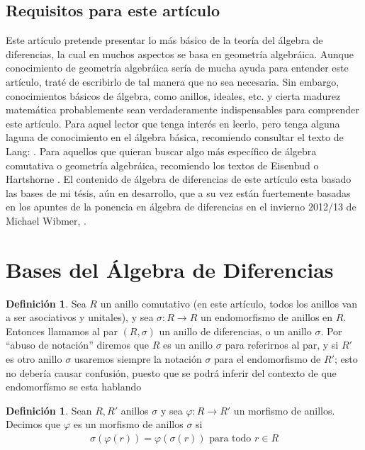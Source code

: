 \documentclass[12pt,a4paper,BCOR15mm,twoside,DIV12]{article}
\def\fa{\text{ para todo }}
\theoremstyle{definition}
\newtheorem{defn}[Satz]{Definición}
\begin{document}
\subsection{Requisitos para este artículo}

Este artículo pretende presentar lo más básico de la teoría del álgebra de diferencias, la cual en muchos aspectos se basa en geometría algebráica. Aunque conocimiento de geometría algebráica sería de mucha ayuda para entender este artículo, traté de escribirlo
de tal manera que no sea necesaria. Sin embargo, conocimientos básicos de álgebra, como anillos, ideales, etc. y cierta madurez matemática probablemente sean verdaderamente indispensables para comprender este artículo. 
Para aquel lector que tenga interés en leerlo, pero tenga alguna laguna de conocimiento en el álgebra básica, recomiendo consultar el texto de Lang: \cite{lang}. Para aquellos que quieran buscar algo más específico de álgebra comutativa
o geometría algebráica, recomiendo los textos de Eisenbud \cite{eisenbud} o Hartshorne \cite{hartshorne}. El contenido de álgebra de diferencias de este artículo esta basado las bases de mi tésis, aún en desarrollo, 
que a su vez están fuertemente basadas en los apuntes de la ponencia en álgebra de diferencias en el invierno 2012/13 de Michael Wibmer, \cite{wibmer}.

\section{Bases del Álgebra de Diferencias}
\begin{defn}
Sea $R$ un anillo comutativo (en este artículo, todos los anillos van a ser asociativos y unitales), y  sea $
\sigma: R \rightarrow R$ un endomorfismo de anillos en $R$. Entonces llamamos al par $(R,\sigma)$ un anillo de diferencias,
o un anillo $\sigma$. Por ``abuso de notación'' diremos que $R$ es un anillo $\sigma$ para referirnos al par, y si $R'$ es otro anillo $\sigma$
usaremos siempre la notación $\sigma$ para el endomorfismo de $R'$; esto no debería causar confusión, puesto que se podrá inferir del contexto de 
que endomorfísmo se esta hablando
\end{defn}

\begin{defn}
Sean $R, R'$ anillos $\sigma$ y sea $\varphi: R \rightarrow R'$ un morfismo de anillos. Decimos que $\varphi$ es un morfismo de anillos $\sigma$ si 
\begin{align*}
\sigma(\varphi(r)) = \varphi(\sigma(r)) \fa r \in R
\end{align*}
\end{defn}
\end{document}
